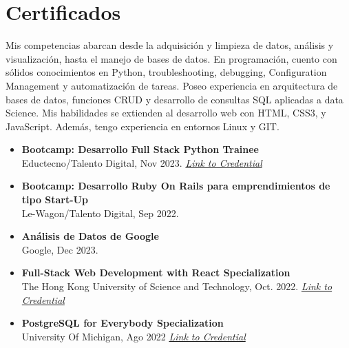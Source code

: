 \documentclass[a4paper,10pt]{article}
\begin{document}
	\section*{Certificados}
				\small      
			Mis competencias abarcan desde la adquisición y limpieza de datos, análisis y visualización, hasta el manejo de bases de datos.  En programación, cuento con sólidos conocimientos en Python, troubleshooting, debugging, Configuration Management y automatización de tareas. Poseo experiencia en arquitectura de bases de datos, funciones CRUD y desarrollo de consultas SQL aplicadas a data Science. Mis habilidades se extienden al desarrollo web con HTML, CSS3, y JavaScript. Además, tengo experiencia en entornos Linux y GIT. 
		\begin{itemize}[left=0pt]
			
			\item \textbf{Bootcamp: Desarrollo Full Stack Python Trainee} \\
			Eductecno/Talento Digital, Nov 2023. \textit{\href{https://www.acreditta.com/credential/1654395b-6317-44bf-9beb-18774afdb129}{Link to Credential}}			
			
			\item \textbf{Bootcamp: Desarrollo Ruby On Rails para emprendimientos de tipo Start-Up} \\
			Le-Wagon/Talento Digital, Sep 2022.
			
			 \vspace{0.2cm} %
			
			\item \textbf{Análisis de Datos de Google} \\
			Google, Dec 2023.
			\textit{\href{}{}}
			
			\item \textbf{Full-Stack Web Development with React Specialization} \\
			The Hong Kong University of Science and Technology, Oct. 2022.
			\textit{\href{https://portfolio-mparraf.herokuapp.com/static/shared/Full-Stack Web Development with React.pdf}{Link to Credential}}
			
			
			\item \textbf{PostgreSQL for Everybody Specialization} \\
			University Of Michigan, Ago  2022
			\textit{\href{https://portfolio-mparraf.herokuapp.com/static/shared/PostgreSQL for Everybody Specialization.pdf}{Link to Credential}}
			

\end{itemize}
\end{document}
